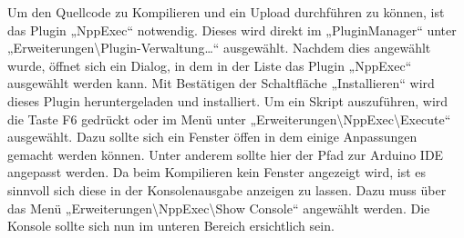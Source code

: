 Um den Quellcode zu Kompilieren und ein Upload durchführen zu können, ist das Plugin „NppExec“ notwendig. Dieses wird direkt im „PluginManager“ unter „Erweiterungen\textbackslash{}Plugin-Verwaltung…“ ausgewählt. Nachdem dies angewählt wurde, öffnet sich ein Dialog, in dem in der Liste das Plugin „NppExec“ ausgewählt werden kann. Mit Bestätigen der Schaltfläche „Installieren“ wird dieses Plugin heruntergeladen und installiert. Um ein Skript auszuführen, wird die Taste F6 gedrückt oder im Menü unter „Erweiterungen\textbackslash{}NppExec\textbackslash{}Execute“ ausgewählt. Dazu sollte sich ein Fenster öffen in dem einige Anpassungen gemacht werden können. Unter anderem sollte hier der Pfad zur Arduino IDE angepasst werden. Da beim Kompilieren kein Fenster angezeigt wird, ist es sinnvoll sich diese in der Konsolenausgabe anzeigen zu lassen. Dazu muss über das Menü „Erweiterungen\textbackslash{}NppExec\textbackslash{}Show Console“ angewählt werden. Die Konsole sollte sich nun im unteren Bereich ersichtlich sein.

